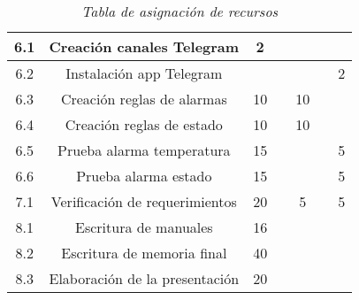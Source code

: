 \begin{table}
{\begin{tabular}{|c|c|c|c|c|c|c|}
  6.1&Creación canales Telegram  & 2 &  &  &  &\\ \hline
 6.2&Instalación app Telegram &  &  &  &  &2\\ \hline
 6.3&Creación reglas de alarmas & 10 &  & 10 &  &\\ \hline
 6.4&Creación reglas de estado &  10 &  & 10 &  &\\ \hline
 6.5&Prueba alarma temperatura & 15 &  &  &  &5\\ \hline
 6.6&Prueba alarma estado & 15 &  &  &  &5\\ \hline
 7.1&Verificación de requerimientos & 20  &  &5  &  &5\\ \hline
 8.1&Escritura de manuales & 16 &  &  &  &\\ \hline
 8.2&Escritura de memoria final & 40 &  &  &  &\\ \hline
 8.3&Elaboración de la presentación & 20 &  &  &  &\\ \hline
 \end{tabular}%
 }
 \caption{\textit{Tabla de asignación de recursos}}
 \label{recursos1}
 \end{table}
